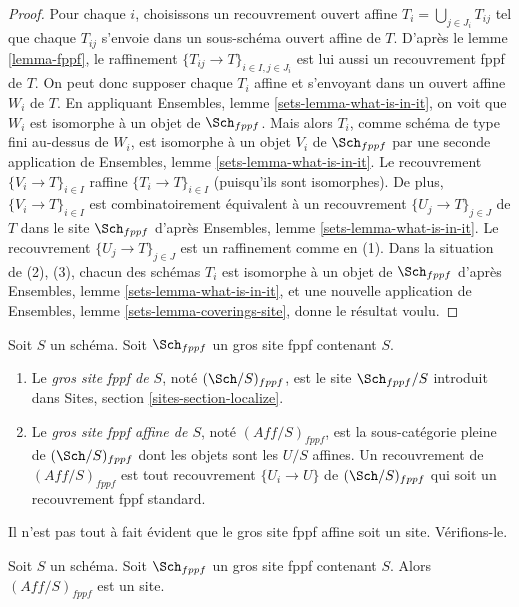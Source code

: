 \begin{proof}
Pour chaque $i$, choisissons un recouvrement ouvert affine $T_i = \bigcup_{j \in J_i} T_{ij}$
tel que chaque $T_{ij}$ s'envoie dans un sous-schéma ouvert affine de $T$. D'après le
lemme \ref{lemma-fppf},
le raffinement $\{T_{ij} \to T\}_{i \in I, j \in J_i}$ est lui aussi un recouvrement fppf
de $T$. On peut donc supposer chaque $T_i$ affine et s'envoyant dans
un ouvert affine $W_i$ de $T$. En appliquant
Ensembles, lemme \ref{sets-lemma-what-is-in-it},
on voit que $W_i$ est isomorphe à un objet de $\Sch_{fppf}$.
Mais alors $T_i$, comme schéma de type fini au-dessus de $W_i$,
est isomorphe à un objet $V_i$ de $\Sch_{fppf}$ par une seconde
application de
Ensembles, lemme \ref{sets-lemma-what-is-in-it}.
Le recouvrement $\{V_i \to T\}_{i \in I}$ raffine $\{T_i \to T\}_{i \in I}$
(puisqu'ils sont isomorphes).
De plus, $\{V_i \to T\}_{i \in I}$ est combinatoirement équivalent à un
recouvrement $\{U_j \to T\}_{j \in J}$ de $T$ dans le site
$\Sch_{fppf}$ d'après
Ensembles, lemme \ref{sets-lemma-what-is-in-it}.
Le recouvrement $\{U_j \to T\}_{j \in J}$ est un raffinement comme en (1).
Dans la situation de (2), (3), chacun des
schémas $T_i$ est isomorphe à un objet de $\Sch_{fppf}$ d'après
Ensembles, lemme \ref{sets-lemma-what-is-in-it},
et une nouvelle application de
Ensembles, lemme \ref{sets-lemma-coverings-site},
donne le résultat voulu.
\end{proof}

\begin{definition}
\label{definition-big-small-fppf}
Soit $S$ un schéma. Soit $\Sch_{fppf}$ un gros site
fppf contenant $S$.
\begin{enumerate}
\item Le {\it gros site fppf de $S$}, noté
$(\Sch/S)_{fppf}$, est le site $\Sch_{fppf}/S$
introduit dans Sites, section \ref{sites-section-localize}.
\item Le {\it gros site fppf affine de $S$}, noté
$(\textit{Aff}/S)_{fppf}$, est la sous-catégorie pleine de
$(\Sch/S)_{fppf}$ dont les objets sont les $U/S$ affines.
Un recouvrement de $(\textit{Aff}/S)_{fppf}$ est tout recouvrement
$\{U_i \to U\}$ de $(\Sch/S)_{fppf}$ qui soit un
recouvrement fppf standard.
\end{enumerate}
\end{definition}

\noindent
Il n'est pas tout à fait évident que
le gros site fppf affine soit un site. Vérifions-le.

\begin{lemma}
\label{lemma-verify-site-fppf}
Soit $S$ un schéma. Soit $\Sch_{fppf}$ un gros site
fppf contenant $S$. Alors $(\textit{Aff}/S)_{fppf}$ est un site.
\end{lemma}

